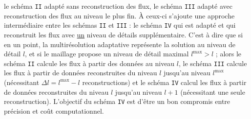 le schéma \texttt{II} adapté sans reconstruction des flux,
le schéma \texttt{III} adapté avec reconstruction des flux au niveau le plus fin.
À ceux-ci s'ajoute une approche intermédiaire entre les schémas \texttt{II} et \texttt{III} : le schéma \texttt{IV}
qui est adapté et qui reconstruit les flux avec \underline{un} niveau de détails supplémentaire.
C'est à dire que si en un point, la multirésolution adaptative représente la solution au niveau de détail $l$, et si le 
maillage propose un niveau de détail maximal $l^{\max} > l$ ; alors le schéma \texttt{II} calcule les flux à partir des données au niveau $l$,
le schéma \texttt{III} calcule les flux à partir de données reconstruites du niveau $l$ jusqu’au niveau $l^{\max}$ (nécessitant $\Delta l=l^{\max}-l$ reconstructions) 
et le schéma \texttt{IV} calcul les flux à partir de données reconstruites du niveau $l$ jusqu'au niveau $l+1$ (nécessitant une seule reconstruction). 
L'objectif du schéma \texttt{IV} est d'être un bon compromis entre précision et coût computationnel.